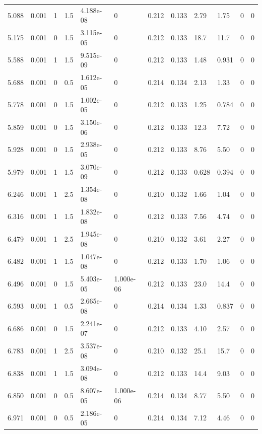 \documentclass[preview]{standalone}
\begin{document}
{{{\begin{tabular}{L{1.2cm}C{1.2cm} C{0.3cm}C{0.5cm} C{1.4cm}C{1.4cm} C{1.4cm}C{1.4cm} C{1.6cm}C{1.6cm} C{1.6cm}C{1.6cm}}
  5.088  &  0.001  & 1     & 1.5 &  4.188e-08  & 0  &  0.212&   0.133& 2.79 & 1.75   &  0 & 0  \\ 
  5.175  &  0.001  & 0     & 1.5 &  3.115e-05  & 0  &  0.212&   0.133& 18.7 & 11.7   &  0 & 0  \\ 
  5.588  &  0.001  & 1     & 1.5 &  9.515e-09  & 0  &  0.212&   0.133& 1.48 & 0.931   &  0 & 0  \\ 
  5.688  &  0.001  & 0     & 0.5 &  1.612e-05  & 0  &  0.214&   0.134& 2.13 & 1.33   &  0 & 0  \\ 
  5.778  &  0.001  & 0     & 1.5 &  1.002e-05  & 0  &  0.212&   0.133& 1.25 & 0.784   &  0 & 0  \\ 
  5.859  &  0.001  & 0     & 1.5 &  3.150e-06  & 0  &  0.212&   0.133& 12.3 & 7.72   &  0 & 0  \\ 
  5.928  &  0.001  & 0     & 1.5 &  2.938e-05  & 0  &  0.212&   0.133& 8.76 & 5.50   &  0 & 0  \\ 
  5.979  &  0.001  & 1     & 1.5 &  3.070e-09  & 0  &  0.212&   0.133& 0.628 & 0.394   &  0 & 0  \\ 
  6.246  &  0.001  & 1     & 2.5 &  1.354e-08  & 0  &  0.210&   0.132& 1.66 & 1.04   &  0 & 0  \\ 
  6.316  &  0.001  & 1     & 1.5 &  1.832e-08  & 0  &  0.212&   0.133& 7.56 & 4.74   &  0 & 0  \\ 
  6.479  &  0.001  & 1     & 2.5 &  1.945e-08  & 0  &  0.210&   0.132& 3.61 & 2.27   &  0 & 0  \\ 
  6.482  &  0.001  & 1     & 1.5 &  1.047e-08  & 0  &  0.212&   0.133& 1.70 & 1.06   &  0 & 0  \\ 
  6.496  &  0.001  & 0     & 1.5 &  5.403e-05  & 1.000e-06  &  0.212&   0.133& 23.0 & 14.4   &  0 & 0  \\ 
  6.593  &  0.001  & 1     & 0.5 &  2.665e-08  & 0  &  0.214&   0.134& 1.33 & 0.837   &  0 & 0  \\ 
  6.686  &  0.001  & 0     & 1.5 &  2.241e-07  & 0  &  0.212&   0.133& 4.10 & 2.57   &  0 & 0  \\ 
  6.783  &  0.001  & 1     & 2.5 &  3.537e-08  & 0  &  0.210&   0.132& 25.1 & 15.7   &  0 & 0  \\ 
  6.838  &  0.001  & 1     & 1.5 &  3.094e-08  & 0  &  0.212&   0.133& 14.4 & 9.03   &  0 & 0  \\ 
  6.850  &  0.001  & 0     & 0.5 &  8.607e-05  & 1.000e-06  &  0.214&   0.134& 8.77 & 5.50   &  0 & 0  \\ 
  6.971  &  0.001  & 0     & 0.5 &  2.186e-05  & 0  &  0.214&   0.134& 7.12 & 4.46   &  0 & 0  \\ 

\end{tabular}}}}
\end{document}
